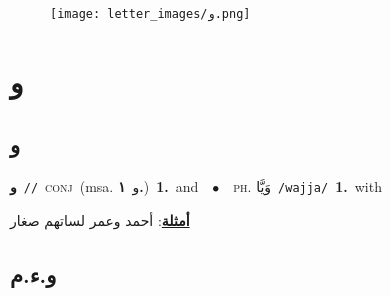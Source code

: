 \documentclass[10pt,a4paper,twoside]{article} %
\begin{document}
\begin{figure*}[t!]\centering\texttt{[image: letter\_images/و.png]}\end{figure*}
\color{white}

 \section*{\foreignlanguage{arabic}{و}} 
 \begin{multicols}{2} 

%
\color{black}
\vspace{-3mm}
\subsection*{\color{blue}\foreignlanguage{arabic}{و}\color{blue}{ (ntws)}} 

{\setlength\topsep{0pt}\textbf{\foreignlanguage{arabic}{و}}\ {\color{gray}\texttt{//}\color{black}}\ \textsc{conj}\ \color{gray}(msa. \foreignlanguage{arabic}{و}~\foreignlanguage{arabic}{\textbf{١.}})\color{black}\ \textbf{1.}~and\ \ $\bullet$\ \ \textsc{ph.} \color{gray} \foreignlanguage{arabic}{وَيَّا}\color{black}\ {\color{gray}\texttt{/{\sffamily wajja}/}\color{black}}\ \textbf{1.}~with\  \begin{flushright}\color{gray}\foreignlanguage{arabic}{\textbf{\underline{\foreignlanguage{arabic}{أمثلة}}}: أحمد وعمر لساتهم صغار}\end{flushright}\color{black}} \vspace{2mm}

\vspace{-3mm}
\subsection*{\color{blue}\foreignlanguage{arabic}{و.ء.م}\color{blue}{}} 


\end{multicols}
\end{document}
